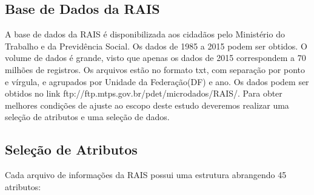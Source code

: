 \documentclass[12pt]{article}
\begin{document}
\subsection{Base de Dados da RAIS}

A base de dados da RAIS é disponibilizada aos cidadãos pelo Ministério do Trabalho e da Previdência Social.
Os dados de 1985 a 2015 podem ser obtidos. O volume de dados é grande, visto que apenas os dados de 2015 correspondem a 70 milhões de registros. Os arquivos estão no formato txt, com separação por ponto e vírgula, e agrupados por Unidade da Federação(DF) e ano.
Os dados podem ser obtidos no link ftp://ftp.mtps.gov.br/pdet/microdados/RAIS/.
Para obter melhores condições de ajuste ao escopo deste estudo deveremos realizar uma seleção de atributos e uma seleção de dados.


\subsection{Seleção de Atributos}

Cada arquivo de informações da RAIS possui uma estrutura abrangendo 45 atributos:
\end{document}
